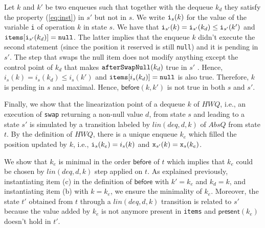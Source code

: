 Let $k$ and $k'$ be two enqueues such that together with the dequeue $k_d$ they satisfy the property (\ref{eq:inst}) in $s'$ but not in $s$.
We write ${\tt i}_s(k)$ for the value of the variable {\tt i} of operation $k$ in state $s$.
We have that ${\tt i}_{s'}(k) = {\tt i}_{s'}(k_d) \leq {\tt i}_{s'}(k')$ and ${\tt items}[{\tt i}_{s'}(k_d)]={\tt null}$. The latter implies that the enqueue $k$ didn't execute
the second statement (since the position it reserved is still {\tt null}) and it is pending in $s'$. The step that swaps the null item does not modify anything except the control point of $k_d$ that makes ${\tt afterSwapNull}(k_d)$ true in $s'$ . Hence, $i_s(k) = i_s(k_d)\leq i_s(k')$ and ${\tt items}[i_s(k_d)] = {\tt null}$ is also true. Therefore, $k$ is pending in $s$ and maximal. Hence, $\mathsf{before}(k,k')$ is not true in both $s$ and $s'$.

Finally, we show that the linearization point of a dequeue $k$ of $\mathit{HWQ}$, i.e., an execution of {\tt swap} returning a non-null value $d$, from state $s$ and leading to a state $s'$ is simulated by a transition labeled by $lin(deq,d,k)$ of $AbsQ$ from state $t$. By the definition of $\mathit{HWQ}$, there is a unique enqueue $k_e$ which filled the position updated by $k$, i.e., ${\tt i}_s(k_e)=i_s(k)$ and ${\tt x}_{s'}(k)={\tt x}_s(k_e)$.

We show that $k_e$ is minimal in the order $\mathsf{before}$ of $t$ which implies that $k_e$ could be chosen by $lin(deq,d,k)$ step applied on $t$. As explained previously, instantiating item (c) in the definition of $\mathsf{before}$ with $k'=k_e$ and $k_d=k$, and instantiating item (b) with $k=k_e$, we ensure the minimality of $k_e$. Moreover, the state $t'$ obtained from $t$ through a $lin(deq,d,k)$ transition is related to $s'$ because the value added by $k_e$ is not anymore present in {\tt items} and $\mathsf{present}(k_e)$ doesn't hold in $t'$.
%
%
